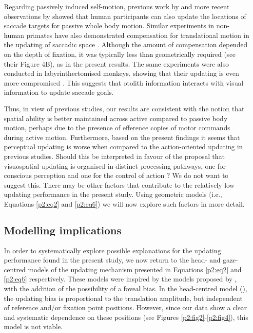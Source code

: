 Regarding passively induced self-motion, previous work by  and more recent observations by  showed that human participants can also update the locations of saccade targets for passive whole body motion. Similar experiments in non-human primates have also demonstrated compensation for translational motion in the updating of saccadic space \cite{li2005a}. Although the amount of compensation depended on the depth of fixation, it was typically less than geometrically required (see their Figure 4B), as in the present results. The same experiments were also conducted in labyrinthectomised monkeys, showing that their updating is even more compromised \cite{li2005b, wei2006}. This suggests that otolith information interacts with visual information to update saccade goals.

Thus, in view of previous studies, our results are consistent with the notion that spatial ability is better maintained across active compared to passive body motion, perhaps due to the presence of efference copies of motor commands during active motion. Furthermore, based on the present findings it seems that perceptual updating is worse when compared to the action-oriented updating in previous studies. Should this be interpreted in favour of the proposal that visuospatial updating is organised in distinct processing pathways, one for conscious perception and one for the control of action \cite{goodale1992}? We do not want to suggest this. There may be other factors that contribute to the relatively low updating performance in the present study. Using geometric models (i.e., Equations \ref{p2:eq2} and \ref{p2:eq6}) we will now explore such factors in more detail.

\subsection{Modelling implications}

In order to systematically explore possible explanations for the updating performance found in the present study, we now return to the head- and gaze-centred models of the updating mechanism presented in Equations \ref{p2:eq2} and \ref{p2:eq6} respectively. These models were inspired by the models proposed by , with the addition of the possibility of a foveal bias. In the head-centred model (), the updating bias is proportional to the translation amplitude, but independent of reference and/or fixation point positions. However, since our data show a clear and systematic dependence on these positions (see Figures \ref{p2:fig2}-\ref{p2:fig4}), this model is not viable.

